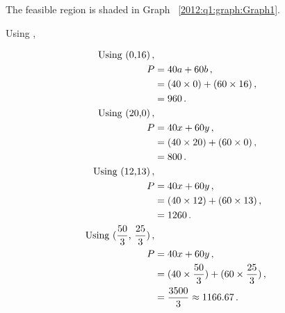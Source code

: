 \begin{subquestions}
\begin{subsubquestions}

\subsubquestion

The feasible region is shaded in Graph ~\ref{2012:q1:graph:Graph1}.

\end{subsubquestions}


\subquestion

\begin{subsubquestions}
	

\subsubquestion

Using ,

\begin{align}
	\text{Using (0,16)} \,, \nonumber \\
	P & = 40a + 60b \,, \nonumber \\
	  & = (40 \times 0) + (60 \times 16) \,, \nonumber \\
	  & = 960 \,. \\
	\text{Using (20,0)} \,, \nonumber \\
	P & = 40x + 60y \,, \nonumber \\
      & = (40 \times 20) + (60 \times 0) \,, \nonumber \\
	  & = 800 \,. \\		  
	\text{Using (12,13)} \,, \nonumber \\
	P & = 40x + 60y \,, \nonumber \\
	  & = (40 \times 12) + (60 \times 13) \,, \nonumber \\
	  & = 1260 \,. \label{2012:q1:eqn:Profit} \\
	\text{Using ($\frac{50}{3}$, $\frac{25}{3}$)} \,, \nonumber \\
	P & = 40x + 60y \,, \nonumber \\
	  & = (40 \times \frac{50}{3}) + (60 \times \frac{25}{3}) \,, \nonumber \\
	  & = \frac{3500}{3} \approx 1166.67 \,. 
\end{align}


\end{subsubquestions}
\end{subquestions}
